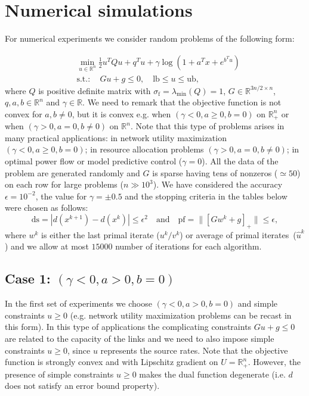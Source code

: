 \documentclass{gOMS2e}
\theoremstyle{plain}
\theoremstyle{definition}
\theoremstyle{remark}
\begin{document}
\section{Numerical simulations}
\label{sec_numerical} For  numerical experiments we consider random
problems of the following form:

\begin{align*}
& \min_{u \in {\mathbb{R}}^n} \frac{1}{2} u^T Q u + q^T u + \gamma \log(1 + a^T x + e^{b^T u}) \\
& \text{s.t.}: \quad Gu + g \leq 0, \quad \text{lb} \leq u \leq
\text{ub},
\end{align*}
where $Q$ is positive definite matrix with
$\sigma_\text{f}=\lambda_\text{min}(Q) = 1$, $G \in {\mathbb{R}}^{3n/2
\times n}$, $q, a, b \in {\mathbb{R}}^n$  and $\gamma \in {\mathbb{R}}$. We need
to remark that the objective function is not convex for $a, b \not =
0$, but it is convex e.g. when $(\gamma < 0, a \geq 0, b=0)$ on
${\mathbb{R}}^n_+$ or when $(\gamma  > 0, a = 0, b \not =0)$ on ${\mathbb{R}}^n$.
Note that this type of problems arises in many practical
applications: in network utility maximization \cite{BecNed:14}
$(\gamma <0, a \geq 0, b=0)$; in resource allocation problems
\cite{XiaBoy:06} $(\gamma >0, a=0, b \not = 0)$; in optimal power
flow or model predictive control \cite{NecNed:13} ($\gamma=0$). All
the data of the problem are generated randomly and $G$ is sparse
having  tens of nonzeros ($\simeq 50$) on each row for large
problems ($n \gg 10^3$). We have considered the accuracy
$\epsilon=10^{-2}$, the value for $\gamma= \pm 0.5$  and the
stopping criteria in the tables below were chosen as follows:
\[  \text{ds}= | d(x^{k+1})  - d(x^k)| \leq \epsilon^2
\quad \text{and} \quad \text{pf}= \|[G w^k + g]_+\| \leq \epsilon,
\] where $w^k$ is either the last primal iterate ($u^k/v^k$) or average
of primal iterates~($\hat{u}^k$) and we allow at most $15000$ number
of iterations for each algorithm.

\subsection{Case 1: $(\gamma < 0, a > 0, b=0)$}
In the first set of experiments we choose $(\gamma < 0, a > 0, b=0)$
and  simple constraints $u \geq 0$ (e.g. network utility
maximization problems \cite{BecNed:14} can be recast in this form).
In this type of applications the complicating constraints $Gu + g
\leq 0$ are related to the capacity of the links and we need to also
impose   simple  constraints $u \geq 0$, since  $u$ represents  the
source rates. Note that the objective function is  strongly convex
and with  Lipschitz gradient on $U={\mathbb{R}}^n_+$.  However, the presence of simple
constraints $u \geq 0$ makes the dual function degenerate (i.e. $d$ does not
satisfy  an error bound property).
\end{document}
